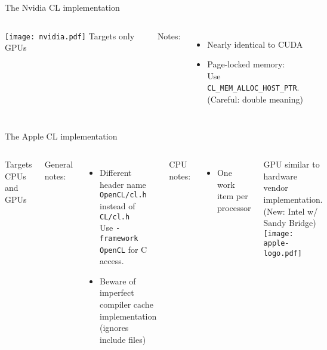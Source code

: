 \documentclass[english,compress]{beamer}
\begin{document}
\begin{frame}{The Nvidia CL implementation}
  \begin{columns}
      \texttt{[image: nvidia.pdf]}
      Targets only GPUs

      \medskip
      Notes:
      \begin{itemize}
        \item Nearly identical to CUDA
        \item Page-locked memory:\\
          Use \texttt{CL\_MEM\_ALLOC\_HOST\_PTR}.\\
          (Careful: double meaning)
      \end{itemize}
  \end{columns}
\end{frame}
\begin{frame}{The Apple CL implementation}
  \begin{columns}
      Targets CPUs and GPUs

      \medskip
      General notes:
      \begin{itemize}
        \item Different header name\\
          \texttt{OpenCL/cl.h} instead of \texttt{CL/cl.h}\\
          Use \texttt{-framework OpenCL} for C access.
        \item Beware of imperfect compiler cache implementation\\
          (ignores include files)
      \end{itemize}
      CPU notes:
      \begin{itemize}
        \item One work item per processor
      \end{itemize}
      GPU similar to hardware vendor implementation.\\
      (New: Intel w/ Sandy Bridge)
      \texttt{[image: apple-logo.pdf]}
  \end{columns}
\end{frame}
\end{document}
